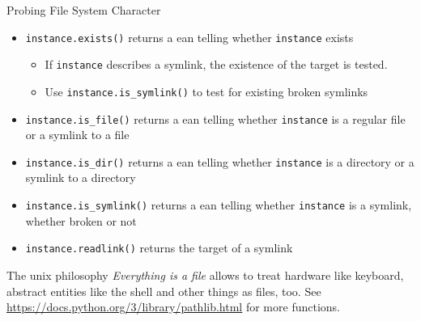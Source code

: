 \begin{frame}[fragile]{Probing File System Character}
%
\begin{itemize}
\item \texttt{instance.exists()} returns a ean telling whether \texttt{instance} exists
	\begin{itemize}
	\item If \texttt{instance} describes a symlink, the existence of the target is tested.
	\item Use \texttt{instance.is\_symlink()} to test for existing broken symlinks
	\end{itemize}
\item \texttt{instance.is\_file()} returns a ean telling whether \texttt{instance} is a regular file or a symlink to a file
\item \texttt{instance.is\_dir()} returns a ean telling whether \texttt{instance} is a directory or a symlink to a directory
\item \texttt{instance.is\_symlink()} returns a ean telling whether \texttt{instance} is a symlink, whether broken or not
\item \texttt{instance.readlink()} returns the target of a symlink
\end{itemize}
%
\begin{hintbox}
\scriptsize
The unix philosophy \emph{Everything is a file} allows to treat hardware like keyboard, abstract entities like the shell and other things as files, too.
See \url{https://docs.python.org/3/library/pathlib.html} for more functions.
\end{hintbox}
%
\end{frame}


